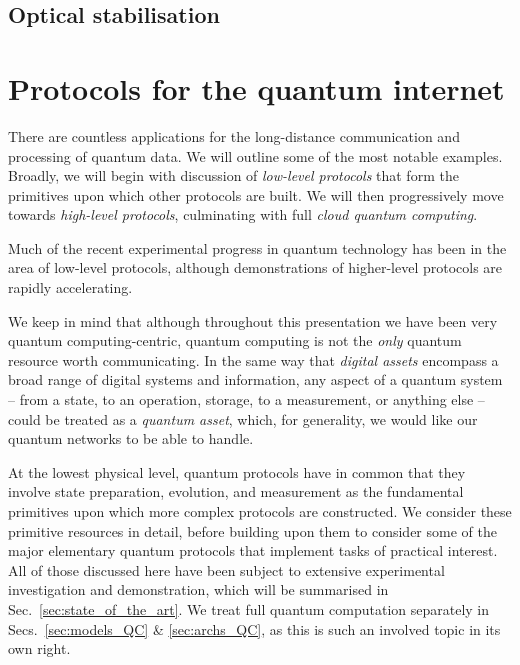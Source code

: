 \documentclass[aps, rmp, twocolumn, amsmath, amssymb, nofootinbib, superscriptaddress, longbibliography, floatfix, table-of-contents, eqsecnum]{revtex4-1}
\newcommand{\comment}[1]{{\color{blue}{\textbf{#1}}}}
\begin{document}
%
%

\subsection{Optical stabilisation} 

\comment{To do!}

%
%

\section{Protocols for the quantum internet} \label{sec:protocols_quant_int} 

There are countless applications for the long-distance communication and processing of quantum data. We will outline some of the most notable examples. Broadly, we will begin with discussion of \textit{low-level protocols} that form the primitives upon which other protocols are built. We will then progressively move towards \textit{high-level protocols}, culminating with full \textit{cloud quantum computing}.

Much of the recent experimental progress in quantum technology has been in the area of low-level protocols, although demonstrations of higher-level protocols are rapidly accelerating.

We keep in mind that although throughout this presentation we have been very quantum computing-centric, quantum computing is not the \textit{only} quantum resource worth communicating. In the same way that \textit{digital assets} encompass a broad range of digital systems and information, any aspect of a quantum system -- from a state, to an operation, storage, to a measurement, or anything else -- could be treated as a \textit{quantum asset}, which, for generality, we would like our quantum networks to be able to handle.

At the lowest physical level, quantum protocols have in common that they involve state preparation, evolution, and measurement as the fundamental primitives upon which more complex protocols are constructed. We consider these primitive resources in detail, before building upon them to consider some of the major elementary quantum protocols that implement tasks of practical interest. All of those discussed here have been subject to extensive experimental investigation and demonstration, which will be summarised in Sec.~\ref{sec:state_of_the_art}. We treat full quantum computation separately in Secs.~\ref{sec:models_QC} \& \ref{sec:archs_QC}, as this is such an involved topic in its own right.
\end{document}
